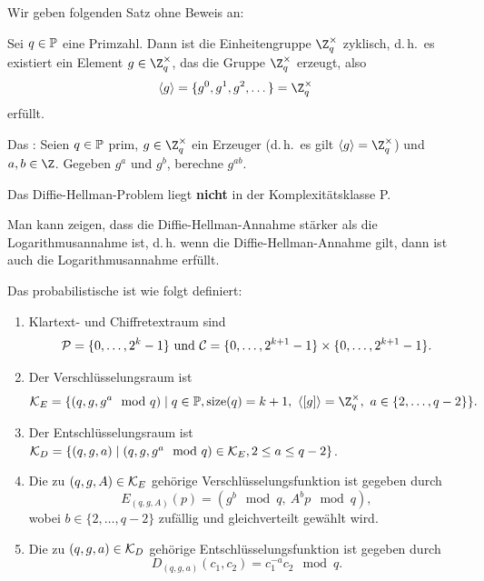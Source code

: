 Wir geben folgenden Satz ohne Beweis an:

\begin{theorem}
 Sei $q \in \mathbb P$ eine Primzahl. Dann ist die Einheitengruppe $\Z_q^{\times}$ zyklisch, d.\,h.~es existiert ein Element $g \in \Z_q^{\times}$, das die Gruppe $\Z_{q}^{\times}$ erzeugt, also 
 \[\langle g \rangle = \{g^0, g^1, g^2, \dotsc\} = \Z_q^{\times}\]
 erfüllt.
\end{theorem}


\begin{definition}
 Das : Seien $q \in \mathbb P$ prim, $g \in \Z_q^{\times}$ ein Erzeuger (d.\,h.~es gilt $\langle g \rangle = \Z_q^{\times}$) und $a, b \in \Z$. Gegeben $g^a$ und $g^b$, berechne $g^{ab}$. 
\end{definition}

\begin{assumption}
 Das Diffie-Hellman-Problem liegt \textbf{nicht} in der Komplexitätsklasse P.
\end{assumption}

\begin{remark}
 Man kann zeigen, dass die Diffie-Hellman-Annahme stärker als die Logarithmusannahme ist, d.\,h. wenn die Diffie-Hellman-Annahme gilt, dann ist auch die Logarithmusannahme erfüllt.
\end{remark}

\begin{definition}
 Das probabilistische  ist wie folgt definiert:
 \begin{enumerate}
  \item Klartext- und Chiffretextraum sind 
  \[\mathcal P = \{0, \dotsc, 2^k-1\} \text{ und } \mathcal C = \{0, \dotsc, 2^{k+1}-1\} \times \{0, \dotsc, 2^{k+1}-1\}.\]
  \item Der Verschlüsselungsraum ist 
  \[\mc K_E = \{(q, g, g^a \mod q) \mid q \in \Primes, \size(q) = k+1, \   \langle [g] \rangle = \Z_q^{\times},\   a \in \{2, \dots, q-2\}\}.\]
  \item Der Entschlüsselungsraum ist $\mathcal K_D = \{(q, g, a) \mid (q, g, g^a \mod q) \in \mathcal K_E, 2 \leq a \leq q -2\}$.
  \item Die zu $(q, g, A) \in \mathcal K_E$ gehörige Verschlüsselungsfunktion ist gegeben durch
  \[E_{(q, g, A)}(p) = (g^b \mod q,\   A^bp \mod q),\]
  wobei $b \in \{2, \dots, q-2\}$ zufällig und gleichverteilt gewählt wird.
  \item Die zu $(q, g, a) \in \mathcal K_D$ gehörige Entschlüsselungsfunktion ist gegeben durch 
  \[D_{(q, g, a)}(c_1, c_2) = c_1^{-a}c_2 \mod q.\]
 \end{enumerate}
\end{definition}

